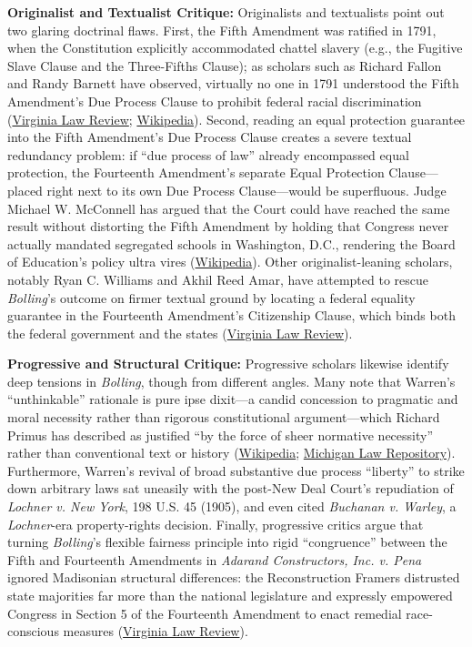 \documentclass[12pt]{article}
\begin{document}
\textbf{Originalist and Textualist Critique:} Originalists and textualists point out two glaring doctrinal flaws. First, the Fifth Amendment was ratified in 1791, when the Constitution explicitly accommodated chattel slavery (e.g., the Fugitive Slave Clause and the Three-Fifths Clause); as scholars such as Richard Fallon and Randy Barnett have observed, virtually no one in 1791 understood the Fifth Amendment's Due Process Clause to prohibit federal racial discrimination (\href{https://virginialawreview.org/wp-content/uploads/2020/12/1879.pdf}{Virginia Law Review}; \href{https://en.wikipedia.org/wiki/Bolling_v._Sharpe}{Wikipedia}). Second, reading an equal protection guarantee into the Fifth Amendment's Due Process Clause creates a severe textual redundancy problem: if ``due process of law'' already encompassed equal protection, the Fourteenth Amendment's separate Equal Protection Clause---placed right next to its own Due Process Clause---would be superfluous. Judge Michael W. McConnell has argued that the Court could have reached the same result without distorting the Fifth Amendment by holding that Congress never actually mandated segregated schools in Washington, D.C., rendering the Board of Education's policy ultra vires (\href{https://en.wikipedia.org/wiki/Bolling_v._Sharpe}{Wikipedia}). Other originalist-leaning scholars, notably Ryan C. Williams and Akhil Reed Amar, have attempted to rescue \textit{Bolling}'s outcome on firmer textual ground by locating a federal equality guarantee in the Fourteenth Amendment's Citizenship Clause, which binds both the federal government and the states (\href{https://virginialawreview.org/articles/originalism-and-other-desegregation-decision/}{Virginia Law Review}).

\textbf{Progressive and Structural Critique:} Progressive scholars likewise identify deep tensions in \textit{Bolling}, though from different angles. Many note that Warren's ``unthinkable'' rationale is pure ipse dixit---a candid concession to pragmatic and moral necessity rather than rigorous constitutional argument---which Richard Primus has described as justified ``by the force of sheer normative necessity'' rather than conventional text or history (\href{https://en.wikipedia.org/wiki/Bolling_v._Sharpe}{Wikipedia}; \href{https://repository.law.umich.edu/cgi/viewcontent.cgi?article=1525&context=facarticles}{Michigan Law Repository}). Furthermore, Warren's revival of broad substantive due process ``liberty'' to strike down arbitrary laws sat uneasily with the post-New Deal Court's repudiation of \textit{Lochner v. New York}, 198 U.S. 45 (1905), and even cited \textit{Buchanan v. Warley}, a \textit{Lochner}-era property-rights decision. Finally, progressive critics argue that turning \textit{Bolling}'s flexible fairness principle into rigid ``congruence'' between the Fifth and Fourteenth Amendments in \textit{Adarand Constructors, Inc. v. Pena} ignored Madisonian structural differences: the Reconstruction Framers distrusted state majorities far more than the national legislature and expressly empowered Congress in Section 5 of the Fourteenth Amendment to enact remedial race-conscious measures (\href{https://virginialawreview.org/wp-content/uploads/2020/12/1879.pdf}{Virginia Law Review}).
\end{document}
